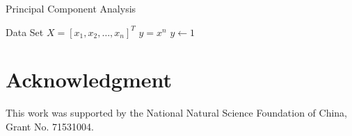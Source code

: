 \documentclass[journal]{IEEEtran}
\begin{document}
\appendices
\begin{algorithm}
 \caption{Principal Component Analysis}
 \label{alg1}
 \begin{algorithmic}
 \REQUIRE Data Set $ X = [x_1, x_2, \ldots, x_n]^T$
 \ENSURE $y = x^n$
 \STATE $y \leftarrow 1$
  \end{algorithmic}
 \end{algorithm}

\section*{Acknowledgment}
This work was supported by the National Natural Science Foundation of China, Grant No. 71531004.



\ifCLASSOPTIONcaptionsoff
  \newpage
\fi










\end{document}
